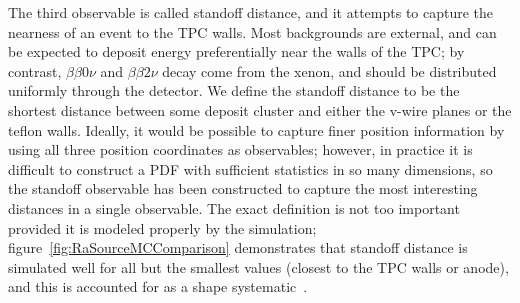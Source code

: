 The third observable is called standoff distance, and it attempts to capture the nearness of an event to the TPC walls.  Most backgrounds are external, and can be expected to deposit energy preferentially near the walls of the TPC; by contrast, $\beta\beta 0\nu$ and $\beta\beta 2\nu$ decay come from the xenon, and should be distributed uniformly through the detector.  We define the standoff distance to be the shortest distance between some deposit cluster and either the v-wire planes or the teflon walls.  Ideally, it would be possible to capture finer position information by using all three position coordinates as observables; however, in practice it is difficult to construct a PDF with sufficient statistics in so many dimensions, so the standoff observable has been constructed to capture the most interesting distances in a single observable.  The exact definition is not too important provided it is modeled properly by the simulation; figure~\ref{fig:RaSourceMCComparison} demonstrates that standoff distance is simulated well for all but the smallest values (closest to the TPC walls or anode), and this is accounted for as a shape systematic~\cite{FittingDocument}.

